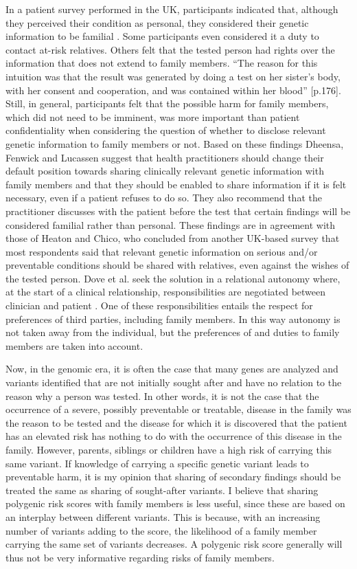 In a patient survey performed in the UK, participants indicated that, although they perceived their condition as personal, they considered their genetic information to be familial \cite{Dheensa_2016}. 
Some participants even considered it a duty to contact at-risk relatives. 
Others felt that the tested person had rights over the information that does not extend to family members. 
“The reason for this intuition was that the result was generated by doing a test on her sister’s body, with her consent and cooperation, and was contained within her blood” \cite{Dheensa_2016}[p.176]. 
Still, in general, participants felt that the possible harm for family members, which did not need to be imminent, was more important than patient confidentiality when considering the question of whether to disclose relevant genetic information to family members or not. 
Based on these findings Dheensa, Fenwick and Lucassen suggest that health practitioners should change their default position towards sharing clinically relevant genetic information with family members and that they should be enabled to share information if it is felt necessary, even if a patient refuses to do so. 
They also recommend that the practitioner discusses with the patient before the test that certain findings will be considered familial rather than personal. 
These findings are in agreement with those of Heaton and Chico, who concluded from another UK-based survey that most respondents said that relevant genetic information on serious and/or preventable conditions should be shared with relatives, even against the wishes of the tested person\cite{Heaton_2015}. 
Dove et al. seek the solution in a relational autonomy where, at the start of a clinical relationship, responsibilities are negotiated between clinician and patient \cite{Dove_2017}. 
One of these responsibilities entails the respect for preferences of third parties, including family members. 
In this way autonomy is not taken away from the individual, but the preferences of and duties to family members are taken into account.

Now, in the genomic era, it is often the case that many genes are analyzed and variants identified that are not initially sought after and have no relation to the reason why a person was tested. 
In other words, it is not the case that the occurrence of a severe, possibly preventable or treatable, disease in the family was the reason to be tested and the disease for which it is discovered that the patient has an elevated risk has nothing to do with the occurrence of this disease in the family. 
However, parents, siblings or children have a high risk of carrying this same variant. If knowledge of carrying a specific genetic variant leads to preventable harm, it is my opinion that sharing of secondary findings should be treated the same as sharing of sought-after variants. 
I believe that sharing polygenic risk scores with family members is less useful, since these are based on an interplay between different variants. 
This is because, with an increasing number of variants adding to the score, the likelihood of a family member carrying the same set of variants decreases. 
A polygenic risk score generally will thus not be very informative regarding risks of family members.

